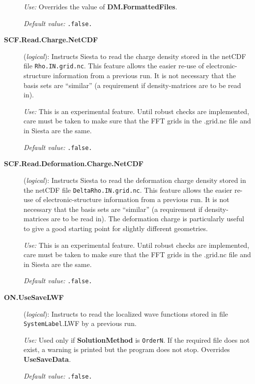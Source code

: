 \documentclass[11pt]{article}
\begin{document}
\begin{description}
{\it Use:} Overrides the value of {\bf DM.FormattedFiles}.

{\it Default value:} {\tt .false.}


\item[{\bf SCF.Read.Charge.NetCDF}] ({\it logical}): 
Instructs Siesta to read the charge density stored in the
netCDF file
{\tt Rho.IN.grid.nc}. This feature allows the easier re-use of electronic-structure
information from a previous run. It is not necessary that the basis
sets are ``similar'' (a requirement if density-matrices are to be read
in). 

{\it Use:} This is an experimental feature.  Until robust checks are
implemented, care must be taken to make sure that the FFT grids in the
.grid.nc file and in Siesta are the same.

{\it Default value:} {\tt .false.}

\item[{\bf SCF.Read.Deformation.Charge.NetCDF}] ({\it logical}): 
Instructs Siesta to read the deformation charge density stored in the
netCDF file
{\tt DeltaRho.IN.grid.nc}. This feature allows the easier re-use of electronic-structure
information from a previous run. It is not necessary that the basis
sets are ``similar'' (a requirement if density-matrices are to be read
in). The deformation charge is particularly useful to give a good
starting point for slightly different geometries.

{\it Use:} This is an experimental feature.  Until robust checks are
implemented, care must be taken to make sure that the FFT grids in the
.grid.nc file and in Siesta are the same.

{\it Default value:} {\tt .false.}


\item[{\bf ON.UseSaveLWF}] ({\it logical}): 
Instructs to read the localized wave functions stored in file
{\tt SystemLabel}.LWF by a previous run.

{\it Use:} Used only if {\bf SolutionMethod} is {\tt OrderN}.
If the required file does not exist, a warning is
printed but the program does not stop. Overrides {\bf UseSaveData}.

{\it Default value:} {\tt .false.}


\end{description}
\end{document}
